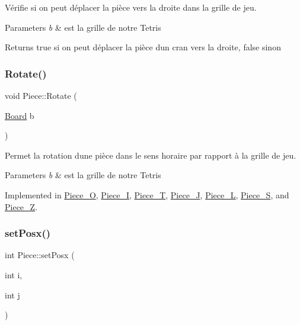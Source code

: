 Vérifie si on peut déplacer la pièce vers la droite dans la grille de jeu. 


\begin{DoxyParams}{Parameters}
{\em b} & est la grille de notre Tetris \\
\hline
\end{DoxyParams}
\begin{DoxyReturn}{Returns}
true si on peut déplacer la pièce d\textquotesingle{}un cran vers la droite, false sinon 
\end{DoxyReturn}
\mbox{\label{classPiece_a078f3cc6281cb8f60af3ae2266c651ba}} 
\subsubsection{\texorpdfstring{Rotate()}{Rotate()}}
{\footnotesize\ttfamily void Piece\+::\+Rotate (\begin{DoxyParamCaption}\item[{\hyperlink{classBoard}{Board}}]{b }\end{DoxyParamCaption})\hspace{0.3cm}{\ttfamily [pure virtual]}}



Permet la rotation d\textquotesingle{}une pièce dans le sens horaire par rapport à la grille de jeu. 


\begin{DoxyParams}{Parameters}
{\em b} & est la grille de notre Tetris \\
\hline
\end{DoxyParams}


Implemented in \hyperlink{classPiece__O_a69812f938582f176cd4cca997cbb87c1}{Piece\+\_\+O}, \hyperlink{classPiece__I_ab7983a575f6d5d41cbf846b6240a9b43}{Piece\+\_\+I}, \hyperlink{classPiece__T_affedcbe550aebd2a9e8ec169d1fe0a9f}{Piece\+\_\+T}, \hyperlink{classPiece__J_a05b85a353b6d5cefb0055206d4a39014}{Piece\+\_\+J}, \hyperlink{classPiece__L_aa865e9d2c6c468ac2921d6adb88f4d1b}{Piece\+\_\+L}, \hyperlink{classPiece__S_aefb2837f39f6b05bc678a3fdadc192b0}{Piece\+\_\+S}, and \hyperlink{classPiece__Z_a50d6c34030c7641b4827353b9b82a68e}{Piece\+\_\+Z}.

\mbox{\label{classPiece_a2c6f76d78f5c448ba42b11f0b2af12f8}} 
\subsubsection{\texorpdfstring{set\+Posx()}{setPosx()}}
{\footnotesize\ttfamily int Piece\+::set\+Posx (\begin{DoxyParamCaption}\item[{int}]{i,  }\item[{int}]{j }\end{DoxyParamCaption})}



